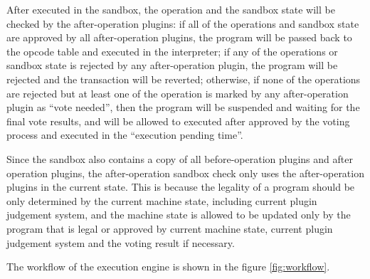 \documentclass[main.tex]{subfiles}
\begin{document}
After executed in the sandbox, the operation and the sandbox state will be checked by the after-operation plugins: if all of the operations and sandbox state are approved by all after-operation plugins, the program will be passed back to the opcode table and executed in the interpreter; if any of the operations or sandbox state is rejected by any after-operation plugin, the program will be rejected and the transaction will be reverted; otherwise, if none of the operations are rejected but at least one of the operation is marked by any after-operation plugin as ``vote needed'', then the program will be suspended and waiting for the final vote results, and will be allowed to executed after approved by the voting process and executed in the ``execution pending time''.

Since the sandbox also contains a copy of all before-operation plugins and after operation plugins, the after-operation sandbox check only uses the after-operation plugins in the current state. This is because the legality of a program should be only determined by the current machine state, including current plugin judgement system, and the machine state is allowed to be updated only by the program that is legal or approved by current machine state, current plugin judgement system and the voting result if necessary.

The workflow of the execution engine is shown in the figure \ref{fig:workflow}.
\end{document}
